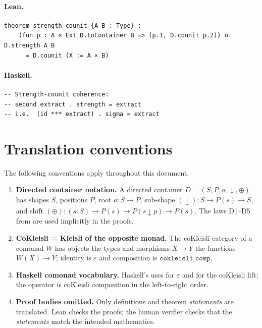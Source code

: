\documentclass[11pt,a4paper]{article}
\begin{document}
\paragraph{Lean.}
\begin{lstlisting}[style=lean]
theorem strength_counit {A B : Type} :
    (fun p : A × Ext D.toContainer B => (p.1, D.counit p.2)) o. D.strength A B
      = D.counit (X := A × B)
\end{lstlisting}

\paragraph{Haskell.}
\begin{lstlisting}[style=haskell]
-- Strength-counit coherence:
-- second extract . strength = extract
-- i.e.  (id *** extract) . sigma = extract
\end{lstlisting}


\section{Translation conventions}

The following conventions apply throughout this document.

\begin{enumerate}
\item \textbf{Directed container notation.}  A directed container
  $D = (S, P, o, \downarrow, \oplus)$ has shapes $S$, positions $P$,
  root $o : S \to P$, sub-shape $(\downarrow) : S \to P(s) \to S$, and
  shift $(\oplus) : (s : S) \to P(s) \to P(s \downarrow p) \to P(s)$.
  The laws D1--D5 from  are used implicitly in the
  proofs.

\item \textbf{CoKleisli = Kleisli of the opposite monad.}  The coKleisli
  category of a comonad $W$ has objects the types and morphisms $X \to Y$ the
  functions $W(X) \to Y$; identity is $\varepsilon$ and composition is
  $\mathtt{cokleisli\_comp}$.

\item \textbf{Haskell comonad vocabulary.}  Haskell's 
  uses  for $\varepsilon$ and  for the coKleisli
  lift; the operator \hask{=>>} is coKleisli composition in the left-to-right
  order.

\item \textbf{Proof bodies omitted.}  Only definitions and theorem
  \emph{statements} are translated.  Lean checks the proofs; the human
  verifier checks that the \emph{statements} match the intended mathematics.
\end{enumerate}
\end{document}
